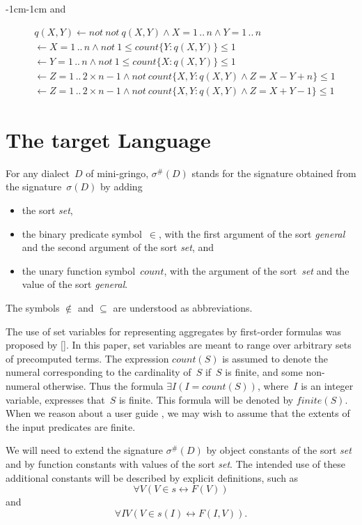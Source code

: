 \documentclass[11pt]{article}
\def\fnt{\mathit{finite}}
\def\gringo{{\sc gringo}}
\def\mg{mini-\gringo}
\def\ar{\leftarrow}
\def\lrar{\leftrightarrow}
\newcommand{\co}{\ensuremath{\mathit{count}}}
\newcommand{\no}{\ensuremath{\mathit{not}}}
\begin{document}
\begin{adjustwidth}{-1cm}{-1cm}
\noindent and

\begin{align}
& q(X,Y) \ar \no\   \no\   q(X,Y) \land X = 1\,..\,n \land Y = 1\,..\,n\label{b1}\\
& \ar X = 1\,..\,n \land \no\ 1\leq \co\{ Y : q(X,Y) \} \leq 1\label{b2}\\
& \ar Y = 1\,..\,n \land \no\ 1\leq \co\{ X : q(X,Y) \} \leq 1\label{b3}\\
& \ar Z = 1\,..\,2\times n-1
  \land \no\   \co\{ X,Y : q(X,Y) \land Z = X-Y+n \} \leq  1
  \label{b4}\\
& \ar Z = 1\,..\,2\times n-1
  \land \no\   \co\{ X,Y : q(X,Y) \land Z = X+Y-1 \} \leq  1
  \label{b5}
\end{align}

\section{The target Language}\label{sec:target}

For any dialect~$D$ of \mg, $\sigma^\#(D)$ stands for the signature
obtained from the signature~$\sigma(D)$ \cite[Section~3.1]{fan26} by adding
\begin{itemize}
\item the sort \emph{set},
\item the binary predicate symbol~$\in$, with the first argument of the sort
  \emph{general} and the second argument of the sort \emph{set}, and
\item the unary function symbol~\co, with the argument of the
  sort~\emph{set} and the value of the sort \emph{general}.
\end{itemize}
The symbols $\not\in$ and $\subseteq$ are understood as abbreviations.

The use of set variables for representing aggregates by first-order formulas
was proposed by \citeauthor{fan22a} [\citeyear{fan22a}].  In this paper, set
variables are meant to range over arbitrary sets of precomputed terms.
The expression $\co(S)$ is assumed to denote the numeral corresponding to the
cardinality of~$S$ if~$S$ is finite, and some non-numeral otherwise.  Thus
the formula $\exists I(I=\co(S))$, where~$I$ is an integer variable, expresses
that~$S$ is finite.  This formula will be denoted by $\fnt(S)$.  When we
reason about a user guide \cite[Section~3]{fan23a}, we may wish to assume
that the extents of the input predicates are finite.

We will need to extend the signature $\sigma^\#(D)$ by object constants of
the sort \emph{set} and by function constants with values of the sort
\emph{set}.  The intended use of these additional constants will be
described by explicit definitions, such as
$$\forall V(V\in s \lrar F(V))$$
and
$$\forall IV(V\in s(I) \lrar F(I,V)).$$


\end{adjustwidth}
\end{document}
